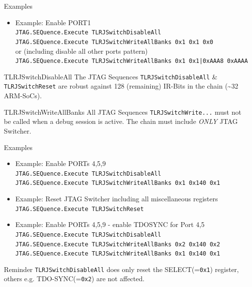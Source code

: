 \documentclass[aspectratio=169,12pt]{beamer}
\begin{document}
\begin{frame}{Examples}
\begin{itemize}
\item Example: Enable PORT1\\
\texttt{\footnotesize{}JTAG.SEQuence.Execute TLRJSwitchDisableAll}\\
\texttt{\footnotesize{}JTAG.SEQuence.Execute TLRJSwitchWriteAllBanks 0x1 0x1 0x0}\\
or (including disable all other ports pattern)\\
\texttt{\footnotesize{}JTAG.SEQuence.Execute TLRJSwitchWriteAllBanks 0x1 0x1|0xAAA8 0xAAAA}\\
\end{itemize}
\begin{block}{TLRJSwitchDisableAll}
The JTAG Sequences \texttt{TLRJSwitchDisableAll} \& \texttt{TLRJSwitchReset} are robust against 128 (remaining) IR-Bits in the chain (\textasciitilde{}32 ARM-SoCs).
\end{block}
\begin{block}{TLRJSwitchWriteAllBanks}
All JTAG Sequences \texttt{TLRJSwitchWrite...} must not be called when a debug session is active. The chain must include \emph{ONLY} JTAG Switcher.
\end{block}
\end{frame}

\begin{frame}{Examples}
\begin{itemize}
\item Example: Enable PORTs 4,5,9\\
\texttt{\footnotesize{}JTAG.SEQuence.Execute TLRJSwitchDisableAll}\\
\texttt{\footnotesize{}JTAG.SEQuence.Execute TLRJSwitchWriteAllBanks 0x1 0x140 0x1}
\item Example: Reset JTAG Switcher including all miscellaneous registers
\texttt{\footnotesize{}JTAG.SEQuence.Execute TLRJSwitchReset}
\item Example: Enable PORTs 4,5,9 - enable TDOSYNC for Port 4,5\\
\texttt{\footnotesize{}JTAG.SEQuence.Execute TLRJSwitchDisableAll}\\
\texttt{\footnotesize{}JTAG.SEQuence.Execute TLRJSwitchWriteAllBanks 0x2 0x140 0x2}\\
\texttt{\footnotesize{}JTAG.SEQuence.Execute TLRJSwitchWriteAllBanks 0x1 0x140 0x1}
\end{itemize}
\begin{block}{Reminder}
\texttt{TLRJSwitchDisableAll} does only reset the SELECT(=\texttt{0x1}) register, others e.g. TDO-SYNC(=\texttt{0x2}) are not affected.
\end{block}
\end{frame}
\end{document}
